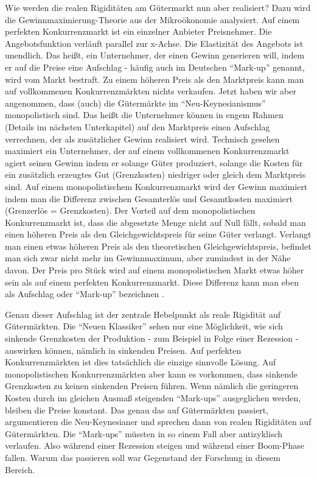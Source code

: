 Wie werden die realen Rigiditäten am Gütermarkt nun aber realisiert? Dazu wird die Gewinnmaximierung-Theorie aus der Mikroökonomie analysiert. Auf einem perfekten Konkurrenzmarkt ist ein einzelner Anbieter Preisnehmer. Die Angebotsfunktion verläuft parallel zur x-Achse. Die Elastizität des Angebots ist unendlich. Das heißt, ein Unternehmer, der einen Gewinn generieren will, indem er auf die Preise eine Aufschlag - häufig auch im Deutschen "`Mark-up"' genannt, wird vom Markt bestraft. Zu einem höheren Preis als den Marktpreis kann man auf vollkommenen Konkurrenzmärkten nichts verkaufen. Jetzt haben wir aber angenommen, dass (auch) die Gütermärkte im "`Neu-Keynesianismus"' monopolistisch sind. Das heißt die Unternehmer können in engem Rahmen (Details im nächsten Unterkapitel) auf den Marktpreis einen Aufschlag verrechnen, der als zusätzlicher Gewinn realisiert wird. Technisch gesehen maximiert ein Unternehmer, der auf einem vollkommenen Konkurrenzmarkt agiert seinen Gewinn indem er solange Güter produziert, solange die Kosten für ein zusätzlich erzeugtes Gut (Grenzkosten) niedriger oder gleich dem Marktpreis sind. Auf einem monopolistischem Konkurrenzmarkt wird der Gewinn maximiert indem man die Differenz zwischen Gesamterlös und Gesamtkosten maximiert (Grenzerlös = Grenzkosten).  Der Vorteil auf dem monopolistischen Konkurrenzmarkt ist, dass die abgesetzte Menge nicht auf Null fällt, sobald man einen höheren Preis als den Gleichgewichtspreis für seine Güter verlangt. Verlangt man einen etwas höheren Preis als den theoretischen Gleichgewichtspreis, befindet man sich zwar nicht mehr im Gewinnmaximum, aber zumindest in der Nähe davon. Der Preis pro Stück wird auf einem monopolistischen Markt etwas höher sein als auf einem perfekten Konkurrenzmarkt. Diese Differenz kann man eben als Aufschlag oder "`Mark-up"' bezeichnen \parencite[S. 379f]{Snowdon2005} \parencite[S. 14]{Mankiw1991}. 

Genau dieser Aufschlag ist der zentrale Hebelpunkt als reale Rigidität auf Gütermärkten. Die "`Neuen Klassiker"' sehen nur eine Möglichkeit, wie sich sinkende Grenzkosten der Produktion - zum Beispiel in Folge einer Rezession - auswirken können, nämlich in sinkenden Preisen. Auf perfekten Konkurrenzmärkten ist dies tatsächlich die einzige sinnvolle Lösung. Auf monopolistischen Konkurrenzmärkten aber kann es vorkommen, dass sinkende Grenzkosten zu keinen sinkenden Preisen führen. Wenn nämlich die geringeren Kosten durch im gleichen Ausmaß steigenden "`Mark-ups"' ausgeglichen werden, bleiben die Preise konstant. Das genau das auf Gütermärkten passiert, argumentieren die Neu-Keynesianer und sprechen dann von realen Rigiditäten auf Gütermärkten. Die "`Mark-ups"' müssten in so einem Fall aber antizyklisch verlaufen. Also während einer Rezession steigen und während einer Boom-Phase fallen. Warum das passieren soll war Gegenstand der Forschung in diesem Bereich.

